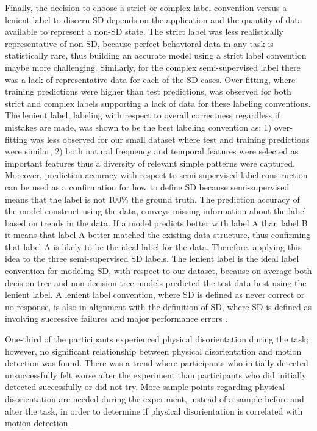 \documentclass{ieeeaccess}
\begin{document}
\indent Finally, the decision to choose a strict or complex label convention versus a lenient label to discern SD depends on the application and the quantity of data available to represent a non-SD state. The strict label was less realistically representative of non-SD, because perfect behavioral data in any task is statistically rare, thus building an accurate model using a strict label convention maybe more challenging. Similarly, for the complex semi-supervised label there was a lack of representative data for each of the SD cases. Over-fitting, where training predictions were higher than test predictions, was observed for both strict and complex labels supporting a lack of data for these labeling conventions. The lenient label, labeling with respect to overall correctness regardless if mistakes are made, was shown to be the best labeling convention as: 1) over-fitting was less observed for our small dataset where test and training predictions were similar, 2) both natural frequency and temporal features were selected as important features thus a diversity of relevant simple patterns were captured. Moreover, prediction accuracy with respect to semi-supervised label construction can be used as a confirmation for how to define SD because semi-supervised means that the label is not 100\% the ground truth. The prediction accuracy of the model construct using the data, conveys missing information about the label based on trends in the data. If a model predicts better with label A than label B it means that label A better matched the existing data structure, thus confirming that label A is likely to be the ideal label for the data. Therefore, applying this idea to the three semi-supervised SD labels. The lenient label is the ideal label convention for modeling SD, with respect to our dataset, because on average both decision tree and non-decision tree models predicted the test data best using the lenient label. A lenient label convention, where SD is defined as never correct or no response, is also in alignment with the definition of SD, where SD is defined as involving successive failures and major performance errors \cite{Newman_2007_SD}.

\indent 

One-third of the participants experienced physical disorientation during the task; however, no significant relationship between physical disorientation and motion detection was found. There was a trend where participants who initially detected unsuccessfully felt worse after the experiment than participants who did initially detected successfully or did not try. More sample points regarding physical disorientation are needed during the experiment, instead of a sample before and after the task, in order to determine if physical disorientation is correlated with motion detection. 
\end{document}
